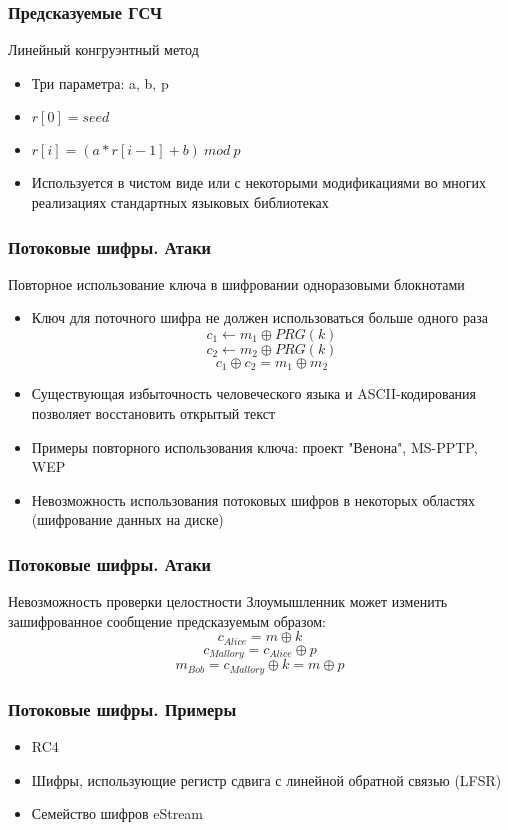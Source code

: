 \documentclass{beamer}
\begin{document}
\begin{frame}
  \frametitle{Предсказуемые ГСЧ}

  \begin{block}{Линейный конгруэнтный метод}
    \begin{itemize}
      \item{Три параметра: a, b, p}
      \item{$r[0] = seed$}
      \item{$r[i] = (a*r[i-1]+b)~mod~p$}
      \item{Используется в чистом виде или с некоторыми модификациями во многих реализациях стандартных языковых библиотеках}
    \end{itemize}
  \end{block}

\end{frame}


\begin{frame}
  \frametitle{Потоковые шифры. Атаки}

  \begin{block}{Повторное использование ключа в шифровании одноразовыми блокнотами}
    \begin{itemize}
      \item{Ключ для поточного шифра не должен использоваться больше одного раза
        \[ c_{1} \leftarrow m_{1} \oplus PRG(k) \]
        \[ c_{2} \leftarrow m_{2} \oplus PRG(k) \]
        \[ c_{1} \oplus c_{2} =  m_{1} \oplus m_{2} \]
      }
      \item{Существующая избыточность человеческого языка и ASCII-кодирования позволяет восстановить открытый текст}
      \item{Примеры повторного использования ключа: проект "Венона", MS-PPTP, WEP}
      \item{Невозможность использования потоковых шифров в некоторых областях (шифрование данных на диске)}
    \end{itemize}
  \end{block}

\end{frame}


\begin{frame}
  \frametitle{Потоковые шифры. Атаки}

  \begin{block}{Невозможность проверки целостности}
    Злоумышленник может изменить зашифрованное сообщение предсказуемым образом:
      \[ c_{Alice} = m \oplus k \]
      \[ c_{Mallory} = c_{Alice} \oplus p \]
      \[ m_{Bob} = c_{Mallory} \oplus k = m \oplus p \]
  \end{block}

\end{frame}


\begin{frame}
  \frametitle{Потоковые шифры. Примеры}

  \begin{itemize}
    \item{RC4}
    \item{Шифры, использующие регистр сдвига с линейной обратной связью (LFSR)}
    \item{Семейство шифров eStream}
  \end{itemize}

\end{frame}
\end{document}
